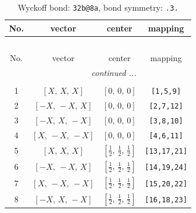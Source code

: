 \documentclass[fleqn,8pt]{jsarticle}
\begin{document}
\begin{longtable}{cccc}
\caption{Wyckoff bond: {\tt 32b@8a}, bond symmetry: {\tt .3.}}
 \\
 \hline \hline
No. & vector & center & mapping \\ \hline \endfirsthead

\multicolumn{3}{l}{\tablename\ \thetable{}} \\
 \hline \hline
No. & vector & center & mapping \\ \hline \endhead

 \hline \hline
\multicolumn{3}{r}{\footnotesize\it continued ...} \\ \endfoot

 \hline \hline
\multicolumn{3}{r}{} \\ \endlastfoot

1 & $\left[ X,\, X,\, X \right]$ & $\left[ 0,\, 0,\, 0 \right]$ & {\tt [1,5,9]} \\ \hline
2 & $\left[ - X,\, - X,\, X \right]$ & $\left[ 0,\, 0,\, 0 \right]$ & {\tt [2,7,12]} \\ \hline
3 & $\left[ - X,\, X,\, - X \right]$ & $\left[ 0,\, 0,\, 0 \right]$ & {\tt [3,8,10]} \\ \hline
4 & $\left[ X,\, - X,\, - X \right]$ & $\left[ 0,\, 0,\, 0 \right]$ & {\tt [4,6,11]} \\ \hline
5 & $\left[ X,\, X,\, X \right]$ & $\left[ \frac{1}{2},\, \frac{1}{2},\, \frac{1}{2} \right]$ & {\tt [13,17,21]} \\ \hline
6 & $\left[ - X,\, - X,\, X \right]$ & $\left[ \frac{1}{2},\, \frac{1}{2},\, \frac{1}{2} \right]$ & {\tt [14,19,24]} \\ \hline
7 & $\left[ X,\, - X,\, - X \right]$ & $\left[ \frac{1}{2},\, \frac{1}{2},\, \frac{1}{2} \right]$ & {\tt [15,20,22]} \\ \hline
8 & $\left[ - X,\, X,\, - X \right]$ & $\left[ \frac{1}{2},\, \frac{1}{2},\, \frac{1}{2} \right]$ & {\tt [16,18,23]} \\
\end{longtable}
\renewcommand{\arraystretch}{1.2}
\end{document}
